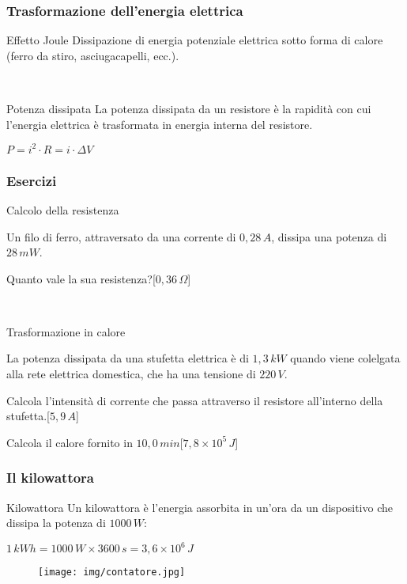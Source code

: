 \documentclass[]{beamer}
\theoremstyle{plain}
\begin{document}
\begin{frame}
  \frametitle{Trasformazione dell'energia elettrica}
  \begin{block}{Effetto Joule}
  Dissipazione di energia potenziale elettrica sotto forma di calore (ferro da stiro, asciugacapelli, ecc.).
  \end{block}\pause
  
  ~
  
  \begin{block}{Potenza dissipata}
    La potenza dissipata da un resistore è la rapidità con cui l'energia elettrica è trasformata in energia interna del resistore.
  \begin{center}
\colorbox{blue!30}{$ P = i^2 \cdot R = i \cdot \Delta V $}
\end{center}
  \end{block}
\end{frame}


\begin{frame}
\frametitle{Esercizi}
\begin{exampleblock}{Calcolo della resistenza}
  \small{
  Un filo di ferro, attraversato da una corrente di $ 0,28 \, A $, dissipa una potenza di $ 28 \, mW $.

  Quanto vale la sua resistenza?\hspace*{\fill}[$ 0,36 \, \Omega $]}
\end{exampleblock}

~

\begin{exampleblock}{Trasformazione in calore}
  \small{
  La potenza dissipata da una stufetta elettrica è di $ 1,3 \, kW $ quando viene colelgata alla rete elettrica domestica, che ha una tensione di $ 220 \, V $.

  Calcola l'intensità di corrente che passa attraverso il resistore all'interno della stufetta.\hspace*{\fill}[$ 5,9 \, A $]
    
  Calcola il calore fornito in $ 10,0 \, min $\hspace*{\fill}[$ 7,8 \times 10^{5} \, J $]}
\end{exampleblock}
\end{frame}


\begin{frame}
  \frametitle{Il kilowattora}
  \begin{block}{Kilowattora}
  Un kilowattora è l’energia assorbita in un'ora da un dispositivo che dissipa la potenza di $1000\, W$:
  \begin{center}
\colorbox{blue!30}{$ 1 \, kWh = 1000 \, W \times 3600 \, s = 3,6 \times 10^6 \, J $}
\end{center}
  \end{block}
    \begin{figure}
  \texttt{[image: img/contatore.jpg]}
    \end{figure}
\end{frame}
\end{document}

